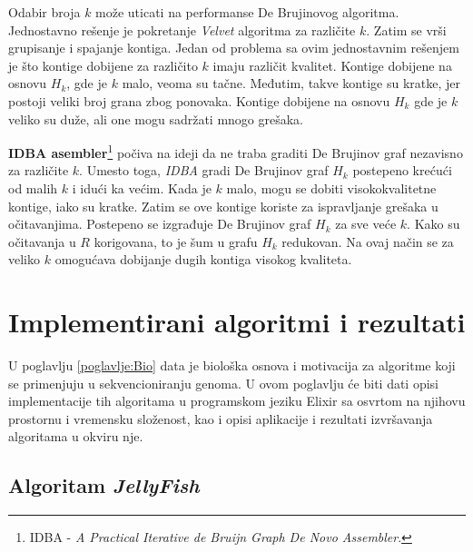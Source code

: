\documentclass[12pt,oneside]{memoir}
\begin{document}
Odabir broja $k$ može uticati na performanse De Brujinovog algoritma. Jednostavno rešenje je pokretanje \textit{Velvet} algoritma za različite $k$. Zatim se vrši grupisanje i spajanje kontiga. Jedan od problema sa ovim jednostavnim rešenjem je što kontige dobijene za različito $k$ imaju različit kvalitet. Kontige dobijene na osnovu $H_k$, gde je $k$ malo, veoma su tačne. Međutim, takve kontige su kratke, jer postoji veliki broj grana zbog ponovaka. Kontige dobijene na osnovu $H_k$ gde je $k$ veliko su duže, ali one mogu sadržati mnogo grešaka.

\textbf{IDBA asembler}\footnote{IDBA - \textit{A Practical Iterative de Bruijn Graph De Novo Assembler}.} počiva na ideji da ne traba graditi De Brujinov graf nezavisno za različite $k$. Umesto toga, \textit{IDBA} gradi De Brujinov graf $H_k$ postepeno krećući od malih $k$ i idući ka većim. Kada je $k$ malo, mogu se dobiti visokokvalitetne kontige, iako su kratke. Zatim se ove kontige koriste za ispravljanje grešaka u očitavanjima. Postepeno se izgrađuje De Brujinov graf $H_k$ za sve veće $k$. Kako su očitavanja u $R$ korigovana, to je šum u grafu $H_k$ redukovan. Na ovaj način se za veliko $k$ omogućava dobijanje dugih kontiga visokog kvaliteta. 

\begin{comment}

Na slici \ref{fig:17} se nalazi pseudokod koji opisuje ideju IDBA asemblera.

\begin{figure}[!ht]
\centering
\texttt{[image: Figura5\_24.PNG]}
\caption{IDBA \cite{WingKinSung}}
\label{fig:17}
\end{figure}

\end{comment}

\chapter{Implementirani algoritmi i rezultati}
\label{odeljak:algoritmiIRezultati}

U poglavlju \ref{poglavlje:Bio} data je biološka osnova i motivacija za algoritme koji se primenjuju u sekvencioniranju genoma. U ovom poglavlju će biti dati opisi implementacije tih algoritama u programskom jeziku Elixir sa osvrtom na njihovu prostornu i vremensku složenost, kao i opisi aplikacije i rezultati izvršavanja algoritama u okviru nje.

\section{Algoritam \textit{JellyFish}}
\label{odeljak:JellyFish}
\end{document}
